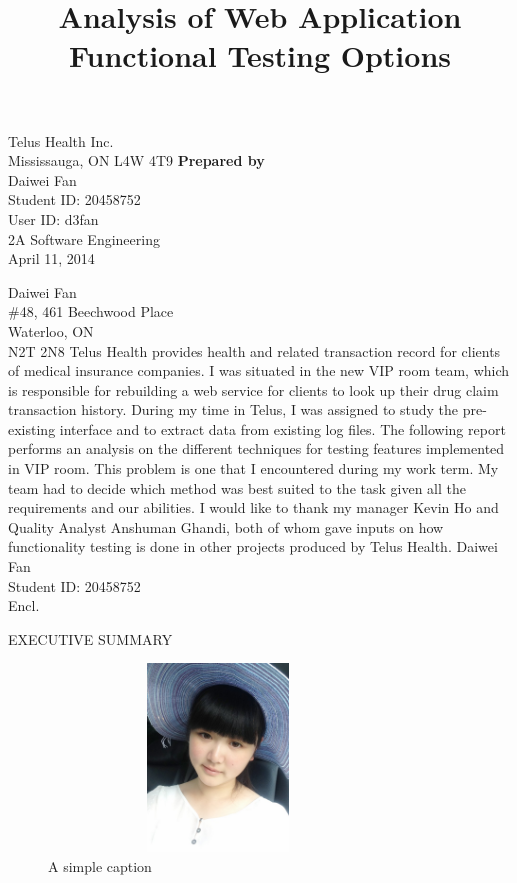\documentclass[12pt]{article}
\begin{document}
\title{Analysis of Web Application Functional Testing Options}
{
	Telus Health Inc.\\
	Mississauga, ON L4W 4T9
}
{
	\textbf{Prepared by}\\[2ex]
	
	Daiwei Fan\\
	Student ID: 20458752\\
	User ID: d3fan\\
	2A Software Engineering\\
	April 11, 2014
}


{
	\noindent
	Daiwei Fan\\
	\#48, 461 Beechwood Place\\
	Waterloo, ON\\
	N2T 2N8
}
{
	Telus Health provides health and related transaction record for clients of medical insurance companies. I was situated in the new VIP room team, which is responsible for rebuilding a web service for clients to look up their drug claim transaction history. During my time in Telus, I was assigned to study the pre-existing interface and to extract data from existing log files.
}
{
	The following report performs an analysis on the different techniques for testing features implemented in VIP room. This problem is one that I encountered during my work term. My team had to decide which method was best suited to the task given all the requirements and our abilities.
}
{
	I would like to thank my manager Kevin Ho and Quality Analyst Anshuman Ghandi, both of whom gave inputs on how functionality testing is done in other projects produced by Telus Health.
}
{
	Daiwei Fan\\
	Student ID: 20458752\\[2ex]
	Encl.
}


EXECUTIVE SUMMARY

\begin{figure}[ht!]
\centering
\includegraphics[width=90mm,height=5cm,keepaspectratio]{img/bbb.jpg}
\caption{A simple caption}
\label{overflow}
\end{figure}
\end{document}
